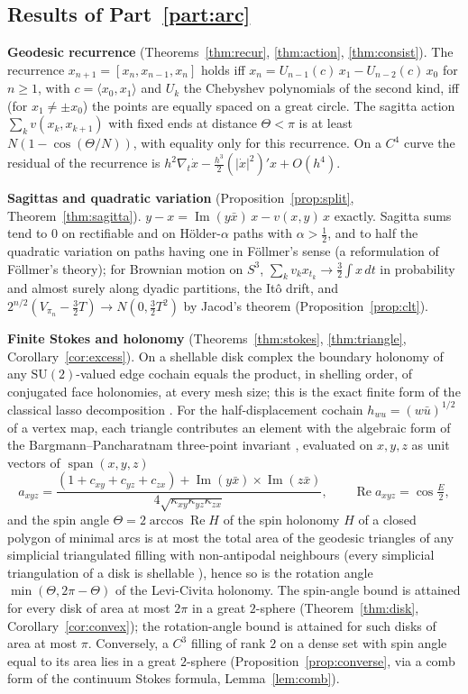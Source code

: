 \documentclass[11pt,reqno]{amsart}
\theoremstyle{definition}
\theoremstyle{remark}
\numberwithin{equation}{section}
\newcommand{\re}{\operatorname{Re}}
\newcommand{\im}{\operatorname{Im}}
\newcommand{\ip}[2]{\langle #1,#2\rangle}
\newcommand{\hp}[3]{[#1,#2,#3]}
\newcommand{\SU}{\mathrm{SU}}
\begin{document}
\subsection{Results of Part~\ref{part:arc}}
\noindent\textbf{Geodesic recurrence} (Theorems~\ref{thm:recur}, \ref{thm:action}, \ref{thm:consist}).
The recurrence $x_{n+1}=\hp{x_n}{x_{n-1}}{x_n}$ holds iff
$x_n=U_{n-1}(c)\,x_1-U_{n-2}(c)\,x_0$ for $n\ge1$, with $c=\ip{x_0}{x_1}$ and $U_k$ the Chebyshev polynomials of the
second kind, iff (for $x_1\ne\pm x_0$) the points are equally spaced on a great circle.  The sagitta action
$\sum_kv(x_k,x_{k+1})$ with fixed ends at distance $\Theta<\pi$ is at least $N(1-\cos(\Theta/N))$, with
equality only for this recurrence.  On a $C^4$ curve the residual of the recurrence is
$h^2\nabla_t\dot x-\tfrac{h^3}{2}(\lvert\dot x\rvert^2)'x+O(h^4)$.

\noindent\textbf{Sagittas and quadratic variation} (Proposition~\ref{prop:split},
Theorem~\ref{thm:sagitta}).  $y-x=\im(y\bar x)\,x-v(x,y)\,x$ exactly.  Sagitta sums tend to $0$ on
rectifiable and on H\"older-$\alpha$ paths with $\alpha>\tfrac12$, and to half the quadratic variation on
paths having one in F\"ollmer's sense (a reformulation of F\"ollmer's theory); for Brownian motion on $S^3$,
$\sum_kv_kx_{t_k}\to\tfrac32\int x\,dt$ in probability and almost surely along dyadic partitions, the It\^o drift, and
$2^{n/2}(V_{\pi_n}-\tfrac32T)\to N(0,\tfrac32T^2)$ by Jacod's theorem (Proposition~\ref{prop:clt}).

\noindent\textbf{Finite Stokes and holonomy} (Theorems~\ref{thm:stokes}, \ref{thm:triangle},
Corollary~\ref{cor:excess}).  On a shellable disk complex the boundary holonomy of any $\SU(2)$-valued edge cochain
equals the product, in shelling order, of conjugated face holonomies, at every mesh size; this is the exact finite form of
the classical lasso decomposition \cite{Bralic80,Levy03,Levy10}.  For the half-displacement cochain $h_{wu}=(w\bar u)^{1/2}$ of a
vertex map, each triangle contributes an element with the algebraic form of the Bargmann--Pancharatnam three-point invariant
\cite{SB88,MS93}, evaluated on $x,y,z$ as unit vectors of $\operatorname{span}(x,y,z)$
\[
a_{xyz}=\frac{(1+c_{xy}+c_{yz}+c_{zx})+\im(y\bar x)\times\im(z\bar x)}{4\sqrt{\kappa_{xy}\kappa_{yz}\kappa_{zx}}},
\qquad \re a_{xyz}=\cos\tfrac{E}{2},
\]
and the spin angle $\Theta=2\arccos\re H$ of the spin holonomy $H$ of a closed polygon of minimal arcs is at most the total area of the
geodesic triangles of any simplicial triangulated filling with non-antipodal neighbours (every simplicial
triangulation of a disk is shellable \cite{DK78}), hence so is the rotation angle $\min(\Theta,2\pi-\Theta)$ of the Levi-Civita holonomy.
The spin-angle bound is attained for every disk of area at most $2\pi$ in a great $2$-sphere (Theorem~\ref{thm:disk},
Corollary~\ref{cor:convex}); the rotation-angle bound is attained for such disks of area at most $\pi$.  Conversely, a $C^3$ filling of rank $2$ on a dense set with spin angle equal to its area lies in a great $2$-sphere
(Proposition~\ref{prop:converse}, via a comb form of the continuum Stokes formula, Lemma~\ref{lem:comb}).
\end{document}
